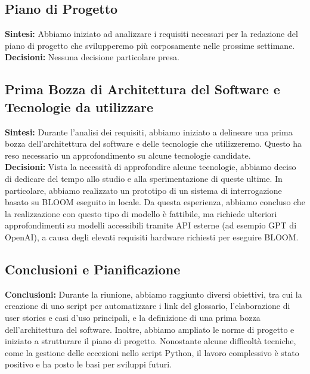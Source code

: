 \documentclass{article}
\begin{document}
    \subsection{Piano di Progetto}
    \textbf{Sintesi:} Abbiamo iniziato ad analizzare i requisiti necessari per la redazione del piano di progetto che svilupperemo più corposamente nelle prossime settimane. \\
    \textbf{Decisioni:} Nessuna decisione particolare presa.

    \subsection{Prima Bozza di Architettura del Software e Tecnologie da utilizzare}
    \textbf{Sintesi:} Durante l'analisi dei requisiti, abbiamo iniziato a delineare una prima bozza dell'architettura del software e delle tecnologie che utilizzeremo. Questo ha reso necessario un approfondimento su alcune tecnologie candidate. \\
    \textbf{Decisioni:} Vista la necessità di approfondire alcune tecnologie, abbiamo deciso di dedicare del tempo allo studio e alla sperimentazione di queste ultime. In particolare, abbiamo realizzato un prototipo di un sistema di interrogazione basato su BLOOM eseguito in locale. Da questa esperienza, abbiamo concluso che la realizzazione con questo tipo di modello è fattibile, ma richiede ulteriori approfondimenti su modelli accessibili tramite API esterne (ad esempio GPT di OpenAI), a causa degli elevati requisiti hardware richiesti per eseguire BLOOM.
    

    \subsection*{Conclusioni e Pianificazione} 
    \textbf{Conclusioni:} Durante la riunione, abbiamo raggiunto diversi obiettivi, tra cui la creazione di uno script per automatizzare i link del glossario, l'elaborazione di user stories e casi d'uso principali, e la definizione di una prima bozza dell'architettura del software. Inoltre, abbiamo ampliato le norme di progetto e iniziato a strutturare il piano di progetto. Nonostante alcune difficoltà tecniche, come la gestione delle eccezioni nello script Python, il lavoro complessivo è stato positivo e ha posto le basi per sviluppi futuri.
\end{document}
